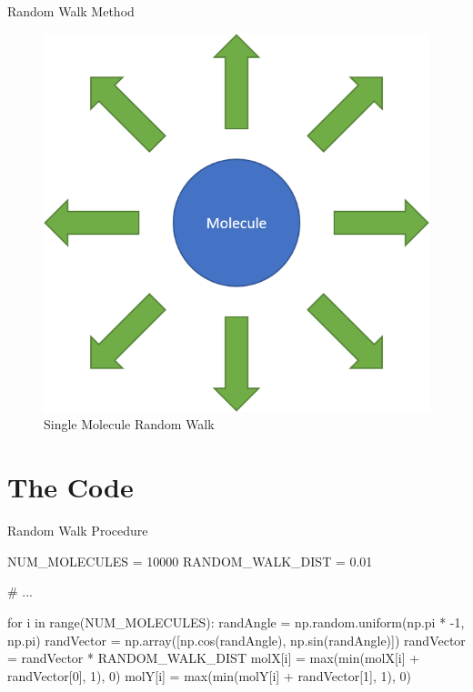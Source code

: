 \documentclass{if-beamer}
\begin{document}
\begin{frame}{Random Walk Method} 
	
	\begin{figure}
		\centering
		\includegraphics[scale=0.6]{molecule.png}
		\caption{Single Molecule Random Walk}
	\end{figure}
	
\end{frame}

\section{The Code}

\begin{frame}[fragile]{Random Walk Procedure}
\begin{python}
NUM_MOLECULES = 10000
RANDOM_WALK_DIST = 0.01

# ...

for i in range(NUM_MOLECULES):
    randAngle = np.random.uniform(np.pi * -1, np.pi)
    randVector = np.array([np.cos(randAngle), np.sin(randAngle)])
    randVector = randVector * RANDOM_WALK_DIST
    molX[i] = max(min(molX[i] + randVector[0], 1), 0)
    molY[i] = max(min(molY[i] + randVector[1], 1), 0)
\end{python}
\end{frame}
\end{document}
